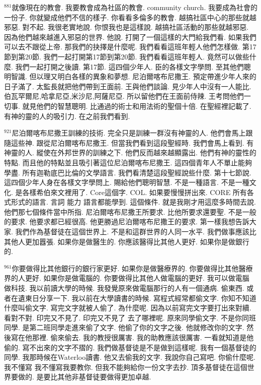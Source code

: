 \documentclass{book}
\begin{document}
$^{881}$就像現在的教會.
我要教會成為社區的教會.
community church.
我要成為社會的一份子.
你就變成他們不信的樣子.
你看看多倫多的教會.
越搞社區中心的那些就越邪惡.
對不起.
我很老實地說.
你恨我也是這樣說.
越搞社區活動的那些就越邪惡.
因為他們越來越進入邪惡的世界.
他說.
打開了一個這樣的大門給我們看.
如果我們可以去不跟從上帝.
那我們的抉擇是什麼呢.
我們看看這班年輕人他們怎樣做.
第17節到第20節.
我們一起打開第17節到第20節.
我們看看這班年輕人.
竟然可以做些什麼.
我們一起打開之後讀.
第17節.
這四個少年人.
臣的各樣文字學問.
至其他們聰明智識.
但以理又明白各樣的異象和夢想.
尼泊爾喀布尼撒王.
預定帶進少年人來的日子滿了.
太監長就把他們帶到王面前.
王與他們談論.
見少年人中沒有一人能比.
伯瓦罕爾尼,哈拿尼亞,米沙尼,阿薩尼亞.
所以留他們在王面前侍辣.
王考問他們一切事.
就見他們的智慧聰明.
比通過的術士和用法術的聖個十倍.
在聖經裡記載了.
有神的靈的人的吸引力.
在之前我們看到.

$^{921}$尼泊爾喀布尼撒王訓練的技術.
完全只是訓練一群沒有神靈的人.
他們會馬上跟隨這些神.
跟從尼泊爾喀布尼撒王.
但當我們看到這段聖經時.
我們會馬上看到.
有神靈的人.
縱使在外邦世界的訓練之下.
他們反而越來越顯露出.
他們有神的靈性的特點.
而且他的特點並且吸引著這位尼泊爾喀布尼撒王.
這四個青年人不單止能夠學盡.
所有迦勒底巴比倫的文學語言.
我們看清楚這段聖經說些什麼.
第十七節說.
這四個少年人身在各樣文字學問上.
賜給他們聰明智慧.
不是一種語言.
不是一種文化.
是各樣希伯來文裡用了.
Core這個字.
COL.
如果要慢慢拼出來.
CORE 所有各式形式的語言.
言詞 能力 語言都能學到.
這個條件.
就是我剛才用這麼多時間去說.
他們那七個條件當中所指.
尼泊爾喀布尼撒王所要求.
比他所要求還要聖.
不是一般的要求.
他要求都已經很高.
他更勝過尼泊爾喀布尼撒王的要求.
第一樣我想告訴大家.
我們作為基督徒在這個世界上.
不是和這群世界的人同一水平.
我們做事應該比其他人更加囂張.
如果你是做醫生的.
你應該醫得比其他人更好.
如果你是做銀行的.

$^{961}$你要做得比其他銀行的銀行家更好.
如果你是做醫療界的.
你要做得比其他醫療界的人更好.
如果你是做電腦的.
你要做得比其他人做電腦的更好.
我可以做電腦 做科技.
我以前讀大學的時候.
我發覺原來做電腦那行的人有一個通病.
偷東西.
或者在遺東日分享一下.
我以前在大學讀書的時候.
寫程式經常都偷文字.
你知不知道什麼叫偷文字.
寫完文字就被人偷了.
為什麼呢.
因為以前寫完文字要打出來對續.
看對不對.
印完又不見了.
印完又不見了 去了哪裡呢.
原來同學偷文字.
不是你同班同學.
是第二班同學走進來偷了文字.
他偷了你的文字之後.
他就修改你的文字.
然後寫在他那裡.
偷來偷去.
我的教授很厲害.
我的助教應該很厲害.
一看就知道是他偷的.
寫不出來的文字不摺的.
我們做基督徒是不是做到這樣呢.
我有一個基督徒的同學.
我那時候在Waterloo讀書.
他又去偷我的文字.
我說你自己寫吧.
你偷什麼呢.
我不懂寫 我不懂寫我要教你.
但我不能夠給你一份文字去抄.
頂多基督徒在這個世界要做的.
是要比其他非基督徒要做得更加卓越.
\end{document}
